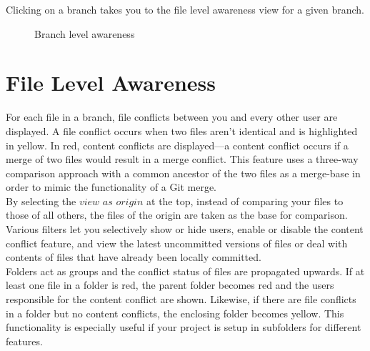 Clicking on a branch takes you to the file level awareness view for a given branch.



\begin{figure}[h!]
  \centering
  \caption{Branch level awareness}
  \label{fig:branchlevel}
\end{figure}





\section{File Level Awareness}

For each file in a branch, file conflicts between you and every other user are displayed. A file conflict occurs when two files aren't identical and is highlighted in yellow. In red, content conflicts are displayed---a content conflict occurs if a merge of two files would result in a merge conflict. This feature uses a three-way comparison approach with a common ancestor of the two files as a merge-base in order to mimic the functionality of a Git merge. \\

By selecting the $view$ $as$ $origin$ at the top, instead of comparing your files to those of all others, the files of the origin are taken as the base for comparison. Various filters let you selectively show or hide users, enable or disable the content conflict feature, and view the latest uncommitted versions of files or deal with contents of files that have already been locally committed. \\

Folders act as groups and the conflict status of files are propagated upwards. If at least one file in a folder is red, the parent folder becomes red and the users responsible for the content conflict are shown. Likewise, if there are file conflicts in a folder but no content conflicts, the enclosing folder becomes yellow. This functionality is especially useful if your project is setup in subfolders for different features. \\

